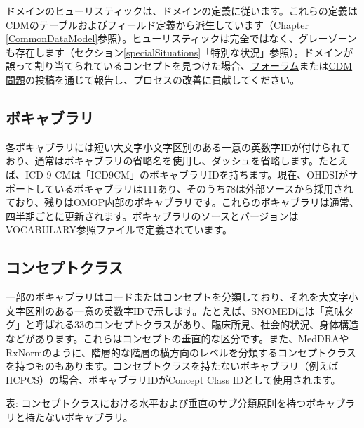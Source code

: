 \documentclass[
  11pt]{book}
\theoremstyle{definition}
\theoremstyle{definition}
\theoremstyle{definition}
\theoremstyle{definition}
\theoremstyle{remark}
\begin{document}
ドメインのヒューリスティックは、ドメインの定義に従います。これらの定義はCDMのテーブルおよびフィールド定義から派生しています（Chapter \ref{CommonDataModel}参照）。ヒューリスティックは完全ではなく、グレーゾーンも存在します（セクション\ref{specialSituations}「特別な状況」参照）。ドメインが誤って割り当てられているコンセプトを見つけた場合、\href{https://forums.ohdsi.org}{フォーラム}または\href{https://github.com/OHDSI/CommonDataModel/issues}{CDM問題}の投稿を通じて報告し、プロセスの改善に貢献してください。

\subsection{ボキャブラリ}\label{ux30dcux30adux30e3ux30d6ux30e9ux30ea}

各ボキャブラリには短い大文字小文字区別のある一意の英数字IDが付けられており、通常はボキャブラリの省略名を使用し、ダッシュを省略します。たとえば、ICD-9-CMは「ICD9CM」のボキャブラリIDを持ちます。現在、OHDSIがサポートしているボキャブラリは111あり、そのうち78は外部ソースから採用されており、残りはOMOP内部のボキャブラリです。これらのボキャブラリは通常、四半期ごとに更新されます。ボキャブラリのソースとバージョンはVOCABULARY参照ファイルで定義されています。 

\subsection{コンセプトクラス}\label{ux30b3ux30f3ux30bbux30d7ux30c8ux30afux30e9ux30b9}

一部のボキャブラリはコードまたはコンセプトを分類しており、それを大文字小文字区別のある一意の英数字IDで示します。たとえば、SNOMEDには「意味タグ」と呼ばれる33のコンセプトクラスがあり、臨床所見、社会的状況、身体構造などがあります。これらはコンセプトの垂直的な区分です。また、MedDRAやRxNormのように、階層的な階層の横方向のレベルを分類するコンセプトクラスを持つものもあります。コンセプトクラスを持たないボキャブラリ（例えばHCPCS）の場合、ボキャブラリIDがConcept Class IDとして使用されます。 

表: \label{tab:sublassification} コンセプトクラスにおける水平および垂直のサブ分類原則を持つボキャブラリと持たないボキャブラリ。
\end{document}
